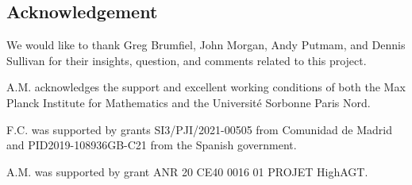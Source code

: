 
\subsection*{Acknowledgement}

We would like to thank Greg Brumfiel, John Morgan, Andy Putmam, and Dennis Sullivan for their insights, question, and comments related to this project.

A.M. acknowledges the support and excellent working conditions of both the Max Planck Institute for Mathematics and the Universit\'e Sorbonne Paris Nord.

F.C. was supported by grants SI3/PJI/2021-00505 from Comunidad de Madrid and PID2019-108936GB-C21 from the Spanish government.

A.M. was supported by grant ANR 20 CE40 0016 01 PROJET HighAGT.